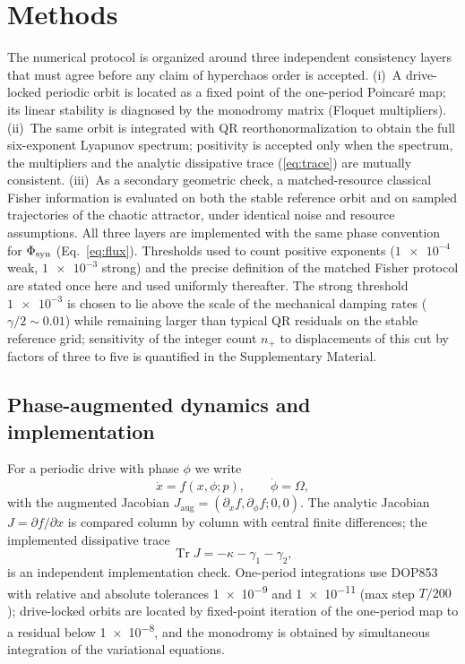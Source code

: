 \documentclass[preprint,numbers,a4paper]{elsarticle}
\newcommand{\Tr}{\operatorname{Tr}}
\begin{document}
\section{Methods}

The numerical protocol is organized around three independent consistency layers that must agree before any claim of hyperchaos order is accepted. (i)~A drive-locked periodic orbit is located as a fixed point of the one-period Poincar\'e map; its linear stability is diagnosed by the monodromy matrix (Floquet multipliers). (ii)~The same orbit is integrated with QR reorthonormalization to obtain the full six-exponent Lyapunov spectrum; positivity is accepted only when the spectrum, the multipliers and the analytic dissipative trace (\cref{eq:trace}) are mutually consistent. (iii)~As a secondary geometric check, a matched-resource classical Fisher information is evaluated on both the stable reference orbit and on sampled trajectories of the chaotic attractor, under identical noise and resource assumptions. All three layers are implemented with the same phase convention for $\Phi_{\rm syn}$ (Eq.~\eqref{eq:flux}). Thresholds used to count positive exponents ($\num{1e-4}$ weak, $\num{1e-3}$ strong) and the precise definition of the matched Fisher protocol are stated once here and used uniformly thereafter. The strong threshold $\num{1e-3}$ is chosen to lie above the scale of the mechanical damping rates ($\gamma/2\sim\num{0.01}$) while remaining larger than typical QR residuals on the stable reference grid; sensitivity of the integer count $n_+$ to displacements of this cut by factors of three to five is quantified in the Supplementary Material.

\subsection{Phase-augmented dynamics and implementation}

For a periodic drive with phase $\phi$ we write
\begin{equation}
\dot{x}=f(x,\phi;p),\qquad \dot\phi=\Omega,
\label{eq:augmented}
\end{equation}
with the augmented Jacobian $J_{\mathrm{aug}}=(\partial_x f,\partial_\phi f;0,0)$. The analytic Jacobian $J=\partial f/\partial x$ is compared column by column with central finite differences; the implemented dissipative trace
\begin{equation}
\Tr J=-\kappa-\gamma_1-\gamma_2,
\label{eq:trace}
\end{equation}
is an independent implementation check. One-period integrations use DOP853~\cite{dormand1980} with relative and absolute tolerances \num{1e-9} and \num{1e-11} (max step $T/200$); drive-locked orbits are located by fixed-point iteration of the one-period map to a residual below \num{1e-8}, and the monodromy is obtained by simultaneous integration of the variational equations.
\end{document}
